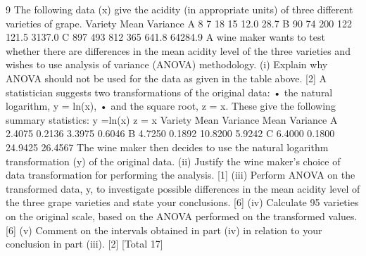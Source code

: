9 The following data (x) give the acidity (in appropriate units) of three different
varieties of grape.
Variety Mean Variance
A 8 7 18 15 12.0 28.7
B 90 74 200 122 121.5 3137.0
C 897 493 812 365 641.8 64284.9
A wine maker wants to test whether there are differences in the mean acidity level of
the three varieties and wishes to use analysis of variance (ANOVA) methodology.
(i) Explain why ANOVA should not be used for the data as given in the table
above. [2]
A statistician suggests two transformations of the original data:
  • the natural logarithm, y = ln(x),
• and the square root, z = x.
These give the following summary statistics:
  y =ln(x) z = x
Variety Mean Variance Mean Variance
A 2.4075 0.2136 3.3975 0.6046
B 4.7250 0.1892 10.8200 5.9242
C 6.4000 0.1800 24.9425 26.4567
The wine maker then decides to use the natural logarithm transformation (y) of the
original data.
(ii) Justify the wine maker’s choice of data transformation for performing the
analysis. [1]
(iii) Perform ANOVA on the transformed data, y, to investigate possible
differences in the mean acidity level of the three grape varieties and state your
conclusions. [6]
(iv) Calculate 95%
varieties on the original scale, based on the ANOVA performed on the
transformed values. [6]
(v) Comment on the intervals obtained in part (iv) in relation to your conclusion
in part (iii). [2]
[Total 17]

